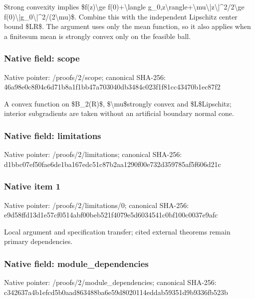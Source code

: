 \documentclass[10pt,a4paper]{article}
\begin{document}
Strong convexity implies \$f(z)\textbackslash{}ge f(0)+\textbackslash{}langle g\_0,z\textbackslash{}rangle+\textbackslash{}mu\textbackslash{}|z\textbackslash{}|\textasciicircum{}2/2\textbackslash{}ge f(0)\textbackslash{}|g\_0\textbackslash{}|\textasciicircum{}2/(2\textbackslash{}mu)\$. Combine this with the independent Lipschitz center bound \$LR\$. The argument uses only the mean function, so it also applies when a finitesum mean is strongly convex only on the feasible ball.


\subsubsection{Native field: scope}


Native pointer: /proofs/2/scope; canonical SHA-256: 46a98e0c8f04c6d71b8a1f1b\allowbreak{}b47a703040db3484c023f1f8\allowbreak{}1cc43470b1ec87f2


A convex function on \$B\_2(R)\$, \$\textbackslash{}mu\$strongly convex and \$L\$Lipschitz; interior subgradients are taken without an artificial boundary normal cone.


\subsubsection{Native field: limitations}


Native pointer: /proofs/2/limitations; canonical SHA-256: d1bbc07ef50fae6de1ba167e\allowbreak{}dc51c87b2aa1290f00e732d3\allowbreak{}59785af5f606d21c



\subsubsection{Native item 1}


Native pointer: /proofs/2/limitations/0; canonical SHA-256: e9d58ffd13d1e57cf0514abf\allowbreak{}00beb521f4079e5d6034541c\allowbreak{}0bf100c0037e9afc


Local argument and specification transfer; cited external theorems remain primary dependencies.


\subsubsection{Native field: module\_dependencies}


Native pointer: /proofs/2/module\_dependencies; canonical SHA-256: c342637a4b1efcd5b0aad863\allowbreak{}488ba6e59d8020114eddab59\allowbreak{}351d9b9336fb523b
\end{document}
